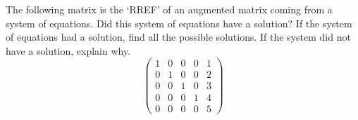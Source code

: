 \documentclass[11pt,letterpaper]{article}
\begin{document}
\sol 



\newpage



 The following matrix is the `RREF' of an augmented matrix coming from a system of equations. Did this system of equations have a solution? If the system of equations had a solution, find all the possible solutions. If the system did not have a solution, explain why. 
	\[
	\begin{pmatrix}
	1 & 0 & 0 & 0 & 1 \\
	0 & 1 & 0 & 0 & 2 \\
	0 & 0 & 1 & 0 & 3 \\
	0 & 0 & 0 & 1 & 4 \\
	0 & 0 & 0 & 0 & 5 
	\end{pmatrix}
	\] \pspace

\sol 
\end{document}
